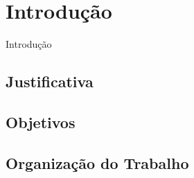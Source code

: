 \chapter{Introdução} \label{cap:introducao}

Introdução

\section{Justificativa}

\section{Objetivos} \label{sec:objetivos}


\section{Organização do Trabalho}
